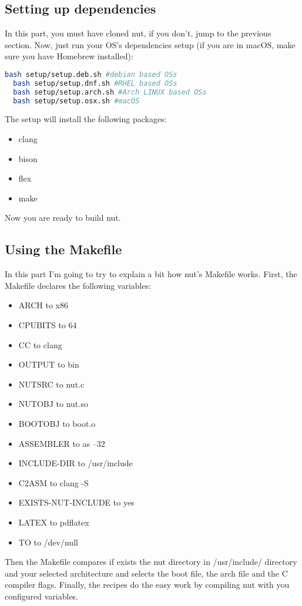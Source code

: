 \documentclass{article}
\begin{document}
  \subsection{Setting up dependencies}
  In this part, you must have cloned nut, if you don't, jump to the previous section. Now, just run your OS's dependencies setup (if you are in macOS, make sure you have Homebrew installed):
  \begin{lstlisting}[language=bash]
  bash setup/setup.deb.sh #debian based OSs
  bash setup/setup.dnf.sh #RHEL based OSs
  bash setup/setup.arch.sh #Arch LINUX based OSs
  bash setup/setup.osx.sh #macOS\end{lstlisting}
  The setup will install the following packages:
  \begin{itemize}
  	\item clang
  	\item bison
  	\item flex
  	\item make
  \end{itemize}
  Now you are ready to build nut.
  \\
  \subsection{Using the Makefile}
  In this part I'm going to try to explain a bit how nut's Makefile works. First, the Makefile declares the following variables:
  \begin{itemize}
  	\item ARCH to x86
  	\item CPUBITS to 64
  	\item CC to clang
  	\item OUTPUT to bin
  	\item NUTSRC to nut.c
  	\item NUTOBJ to nut.so
  	\item BOOTOBJ to boot.o
  	\item ASSEMBLER to as --32
  	\item INCLUDE-DIR to /usr/include
  	\item C2ASM to clang -S
  	\item EXISTS-NUT-INCLUDE to yes
  	\item LATEX to pdflatex
  	\item TO to /dev/null
  \end{itemize}
  Then the Makefile compares if exists the nut directory in /usr/include/ directory and your selected architecture and selects the boot file, the arch file and the C compiler flags. Finally, the recipes do the easy work by compiling nut with you configured variables.
\end{document}
